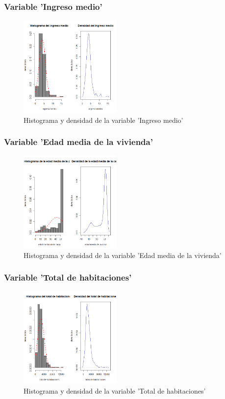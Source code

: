 \documentclass[12pt]{beamer}
\begin{document}
\begin{frame}
\frametitle{Variable 'Ingreso medio'}
\begin{figure}[!h]
    \begin{center}
        \includegraphics[width=5cm]{imagenes/2.png}
        \caption{Histograma y densidad de la variable 'Ingreso medio'}
        \label{fig:Densidad}
    \end{center}
\end{figure}
\end{frame}

\begin{frame}
\frametitle{Variable 'Edad media de la vivienda'}
\begin{figure}[!h]
    \begin{center}
        \includegraphics[width=5cm]{imagenes/3.png}
        \caption{Histograma y densidad de la variable 'Edad media de la vivienda'}
        \label{fig:Densidad}
    \end{center}
\end{figure}
\end{frame}

\begin{frame}
\frametitle{Variable 'Total de habitaciones'}
\begin{figure}[!h]
    \begin{center}
        \includegraphics[width=5cm]{imagenes/4.png}
        \caption{Histograma y densidad de la variable 'Total de habitaciones'}
        \label{fig:Densidad}
    \end{center}
\end{figure}
\end{frame}
\end{document}
